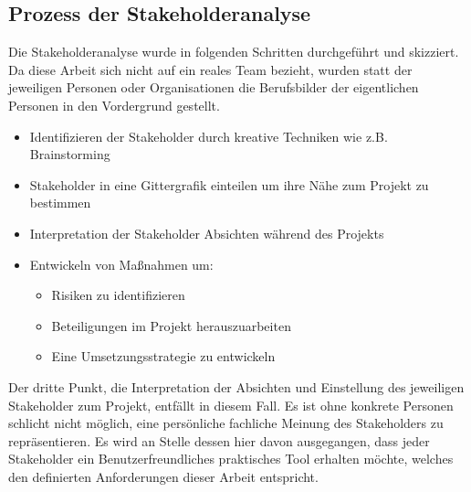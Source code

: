 \documentclass[pagesize, paper=a4, fontsize=12pt, titlepage=true, headings=small, headnosepline, abstractoff, liststotoc, nochapterprefix, plainheadsepline, twoside]{scrreprt}
\begin{document}
\subsection{Prozess der Stakeholderanalyse}
Die Stakeholderanalyse wurde in folgenden Schritten durchgeführt und skizziert. Da diese Arbeit sich nicht auf ein reales Team bezieht, wurden statt der jeweiligen Personen oder Organisationen die Berufsbilder der eigentlichen Personen in den Vordergrund gestellt.
\begin{itemize}
\item Identifizieren der Stakeholder durch kreative Techniken wie z.B. Brainstorming
\item Stakeholder in eine Gittergrafik einteilen um ihre Nähe zum Projekt zu bestimmen
\item Interpretation der Stakeholder Absichten während des Projekts
\item Entwickeln von Maßnahmen um:
	\begin{itemize}
	\item Risiken zu identifizieren
	\item Beteiligungen im Projekt herauszuarbeiten
	\item Eine Umsetzungsstrategie zu entwickeln
	\end{itemize}
\end{itemize}

Der dritte Punkt, die Interpretation der Absichten und Einstellung des jeweiligen Stakeholder zum Projekt, entfällt in diesem Fall. Es ist ohne konkrete Personen schlicht nicht möglich, eine persönliche fachliche Meinung des Stakeholders zu repräsentieren. Es wird an Stelle dessen hier davon ausgegangen, dass jeder Stakeholder ein Benutzerfreundliches praktisches Tool erhalten möchte, welches den definierten Anforderungen dieser Arbeit entspricht.
\end{document}
